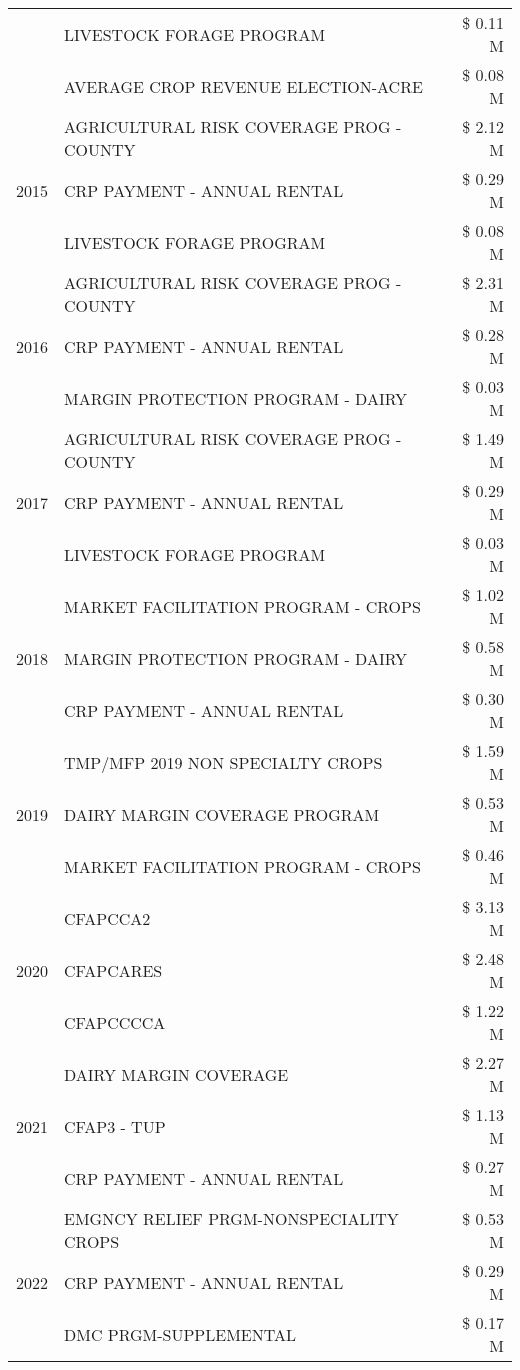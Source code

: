 \begin{tabular}{llr}
 & LIVESTOCK FORAGE PROGRAM & \$ 0.11 M \\
 & AVERAGE CROP REVENUE ELECTION-ACRE & \$ 0.08 M \\
\cline{1-3}
\multirow[t]{3}{*}{2015} & AGRICULTURAL RISK COVERAGE PROG - COUNTY & \$ 2.12 M \\
 & CRP PAYMENT - ANNUAL RENTAL & \$ 0.29 M \\
 & LIVESTOCK FORAGE PROGRAM & \$ 0.08 M \\
\cline{1-3}
\multirow[t]{3}{*}{2016} & AGRICULTURAL RISK COVERAGE PROG - COUNTY & \$ 2.31 M \\
 & CRP PAYMENT - ANNUAL RENTAL & \$ 0.28 M \\
 & MARGIN PROTECTION PROGRAM - DAIRY & \$ 0.03 M \\
\cline{1-3}
\multirow[t]{3}{*}{2017} & AGRICULTURAL RISK COVERAGE PROG - COUNTY & \$ 1.49 M \\
 & CRP PAYMENT - ANNUAL RENTAL & \$ 0.29 M \\
 & LIVESTOCK FORAGE PROGRAM & \$ 0.03 M \\
\cline{1-3}
\multirow[t]{3}{*}{2018} & MARKET FACILITATION PROGRAM - CROPS & \$ 1.02 M \\
 & MARGIN PROTECTION PROGRAM - DAIRY & \$ 0.58 M \\
 & CRP PAYMENT - ANNUAL RENTAL & \$ 0.30 M \\
\cline{1-3}
\multirow[t]{3}{*}{2019} & TMP/MFP 2019 NON SPECIALTY CROPS & \$ 1.59 M \\
 & DAIRY MARGIN COVERAGE PROGRAM & \$ 0.53 M \\
 & MARKET FACILITATION PROGRAM - CROPS & \$ 0.46 M \\
\cline{1-3}
\multirow[t]{3}{*}{2020} & CFAPCCA2 & \$ 3.13 M \\
 & CFAPCARES & \$ 2.48 M \\
 & CFAPCCCCA & \$ 1.22 M \\
\cline{1-3}
\multirow[t]{3}{*}{2021} & DAIRY MARGIN COVERAGE & \$ 2.27 M \\
 & CFAP3 - TUP & \$ 1.13 M \\
 & CRP PAYMENT - ANNUAL RENTAL & \$ 0.27 M \\
\cline{1-3}
\multirow[t]{3}{*}{2022} & EMGNCY RELIEF PRGM-NONSPECIALITY CROPS & \$ 0.53 M \\
 & CRP PAYMENT - ANNUAL RENTAL & \$ 0.29 M \\
 & DMC PRGM-SUPPLEMENTAL & \$ 0.17 M \\
\cline{1-3}
\bottomrule
\end{tabular}
